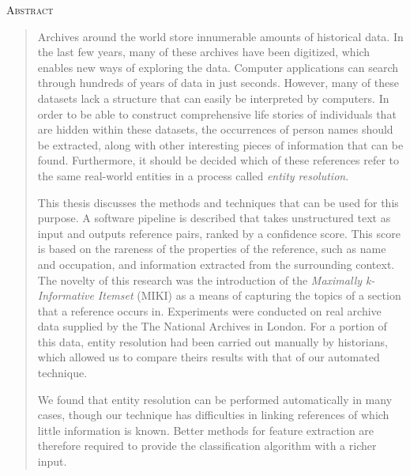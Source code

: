 \vspace*{\fill}

\begin{center}
    \textsc{Abstract}
\end{center}

\begin{quotation}
\noindent Archives around the world store innumerable amounts of historical data.
In the last few years, many of these archives have been digitized, which enables new ways of exploring the data.
Computer applications can search through hundreds of years of data in just seconds.
However, many of these datasets lack a structure that can easily be interpreted by computers.
In order to be able to construct comprehensive life stories of individuals that are hidden within these datasets, the occurrences of person names should be extracted, along with other interesting pieces of information that can be found.
Furthermore, it should be decided which of these references refer to the same real-world entities in a process called \emph{entity resolution}.

This thesis discusses the methods and techniques that can be used for this purpose.
A software pipeline is described that takes unstructured text as input and outputs reference pairs, ranked by a confidence score.
This score is based on the rareness of the properties of the reference, such as name and occupation, and information extracted from the surrounding context.
The novelty of this research was the introduction of the \emph{Maximally k-Informative Itemset} (MIKI) as a means of capturing the topics of a section that a reference occurs in.
Experiments were conducted on real archive data supplied by the The National Archives in London.
For a portion of this data, entity resolution had been carried out manually by historians, which allowed us to compare theirs results with that of our automated technique.

We found that entity resolution can be performed automatically in many cases, though our technique has difficulties in linking references of which little information is known.
Better methods for feature extraction are therefore required to provide the classification algorithm with a richer input.

\end{quotation}
\vspace*{\fill}